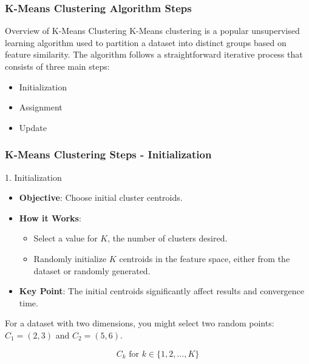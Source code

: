 \documentclass[aspectratio=169]{beamer}
\begin{document}
\begin{frame}
    \frametitle{K-Means Clustering Algorithm Steps}
    \begin{block}{Overview of K-Means Clustering}
        K-Means clustering is a popular unsupervised learning algorithm used to partition a dataset into distinct groups based on feature similarity. The algorithm follows a straightforward iterative process that consists of three main steps: 
        \begin{itemize}
            \item Initialization
            \item Assignment
            \item Update
        \end{itemize}
    \end{block}
\end{frame}

\begin{frame}
    \frametitle{K-Means Clustering Steps - Initialization}
    \begin{block}{1. Initialization}
        \begin{itemize}
            \item \textbf{Objective}: Choose initial cluster centroids.
            \item \textbf{How it Works}:
            \begin{itemize}
                \item Select a value for \(K\), the number of clusters desired.
                \item Randomly initialize \(K\) centroids in the feature space, either from the dataset or randomly generated.
            \end{itemize}
            \item \textbf{Key Point}: The initial centroids significantly affect results and convergence time.
        \end{itemize}
        \begin{example}
            For a dataset with two dimensions, you might select two random points: \(C_1 = (2, 3)\) and \(C_2 = (5, 6)\).
        \end{example}
        \begin{equation}
            C_k \text{ for } k \in \{1, 2, \ldots, K\}
        \end{equation}
    \end{block}
\end{frame}
\end{document}
